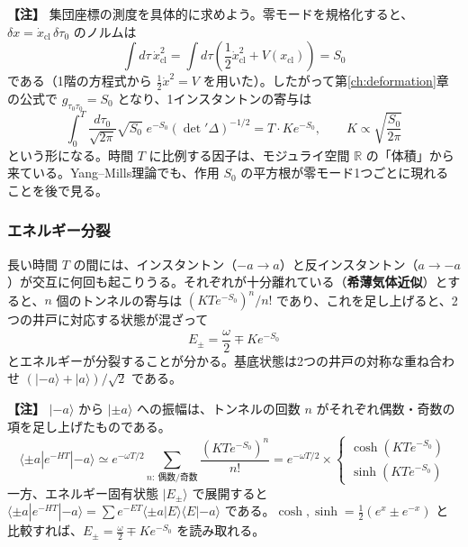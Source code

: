 \documentclass[uplatex, dvipdfmx, book]{jsbook}
\let\origsubsubsection\subsubsection
\renewcommand{\subsection}{\origsubsubsection}
\renewcommand{\subsubsection}{\paragraph}
\newenvironment{note}{\vspace{1ex}\par\footnotesize\noindent\textbf{【注】}}{\par\vspace{1ex}}
\begin{document}
\begin{note}
集団座標の測度を具体的に求めよう。零モードを規格化すると、$\delta x = \dot{x}_{\text{cl}}\,\delta\tau_0$ のノルムは
\begin{equation*}
    \int d\tau\, \dot{x}_{\text{cl}}^2 = \int d\tau \left( \frac{1}{2}\dot{x}_{\text{cl}}^2 + V(x_{\text{cl}}) \right) = S_0
\end{equation*}
である（1階の方程式から $\frac{1}{2}\dot{x}^2 = V$ を用いた）。したがって第\ref{ch:deformation}章の公式で $g_{\tau_0\tau_0} = S_0$ となり、1インスタントンの寄与は
\begin{equation*}
    \int_0^T \frac{d\tau_0}{\sqrt{2\pi}}\sqrt{S_0}\; e^{-S_0}\left({\det}'\Delta\right)^{-1/2} = T \cdot K e^{-S_0}, \qquad K \propto \sqrt{\frac{S_0}{2\pi}}
\end{equation*}
という形になる。時間 $T$ に比例する因子は、モジュライ空間 $\mathbb{R}$ の「体積」から来ている。Yang--Mills理論でも、作用 $S_0$ の平方根が零モード1つごとに現れることを後で見る。
\end{note}

\subsection{エネルギー分裂}

長い時間 $T$ の間には、インスタントン（$-a \to a$）と反インスタントン（$a \to -a$）が交互に何回も起こりうる。それぞれが十分離れている（\textbf{希薄気体近似}）とすると、$n$ 個のトンネルの寄与は $(KTe^{-S_0})^n/n!$ であり、これを足し上げると、2つの井戸に対応する状態が混ざって
\begin{equation}
    E_\pm = \frac{\omega}{2} \mp K e^{-S_0}
\end{equation}
とエネルギーが分裂することが分かる。基底状態は2つの井戸の対称な重ね合わせ $(|{-a}\rangle + |a\rangle)/\sqrt{2}$ である。

\begin{note}
$|{-a}\rangle$ から $|{\pm a}\rangle$ への振幅は、トンネルの回数 $n$ がそれぞれ偶数・奇数の項を足し上げたものである。
\begin{equation*}
    \langle \pm a | e^{-HT} | {-a} \rangle \simeq e^{-\omega T/2}\sum_{n:\ \text{偶数/奇数}} \frac{(KTe^{-S_0})^n}{n!} = e^{-\omega T/2} \times \begin{cases} \cosh(KTe^{-S_0}) \\ \sinh(KTe^{-S_0}) \end{cases}
\end{equation*}
一方、エネルギー固有状態 $|E_\pm\rangle$ で展開すると $\langle \pm a|e^{-HT}|{-a}\rangle = \sum e^{-E T}\langle\pm a|E\rangle\langle E|{-a}\rangle$ である。$\cosh, \sinh = \frac{1}{2}(e^{x} \pm e^{-x})$ と比較すれば、$E_\pm = \frac{\omega}{2} \mp Ke^{-S_0}$ を読み取れる。
\end{note}
\end{document}
